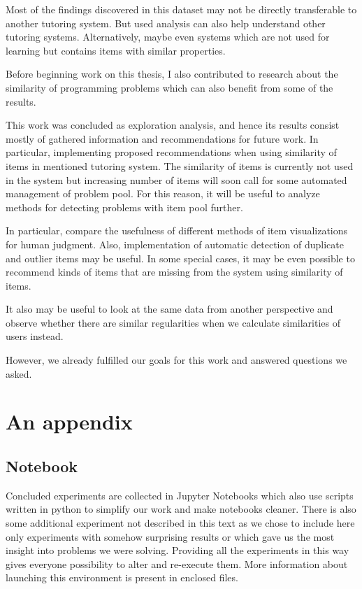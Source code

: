 \documentclass[
  digital, %
  table,   %
  nolof,     %
  nolot,     %
  nocover,
  color,
  final, %
]{fithesis3}
\begin{document}
Most of the findings discovered in this dataset may not be directly transferable to another tutoring system. But used analysis can also help understand other tutoring systems. Alternatively, maybe even systems which are not used for learning but contains items with similar properties.

Before beginning work on this thesis, I also contributed to research about the similarity of programming problems \cite{pelanek2018programming} which can also benefit from some of the results. %


This work was concluded as exploration analysis, and hence its results consist mostly of gathered information and recommendations for future work. In particular, implementing proposed recommendations when using similarity of items in mentioned tutoring system. The similarity of items is currently not used in the system \umimeCesky{} but increasing number of items will soon call for some automated management of problem pool. For this reason, it will be useful to analyze methods for detecting problems with item pool further.

In particular, compare the usefulness of different methods of item visualizations for human judgment. Also, implementation of automatic detection of duplicate and outlier items may be useful. In some special cases, it may be even possible to recommend kinds of items that are missing from the system using similarity of items.

It also may be useful to look at the same data from another perspective and observe whether there are similar regularities when we calculate similarities of users instead.


However, we already fulfilled our goals for this work and answered questions we asked.


\makeatletter\thesis@blocks@clear\makeatother

\appendix %
\chapter{An appendix}


\section{Notebook}\label{notebook}

Concluded experiments are collected in Jupyter Notebooks which also use scripts written in python to simplify our work and make notebooks cleaner. There is also some additional experiment not described in this text as we chose to include here only experiments with somehow surprising results or which gave us the most insight into problems we were solving. Providing all the experiments in this way gives everyone possibility to alter and re-execute them. More information about launching this environment is present in enclosed files.
\end{document}
